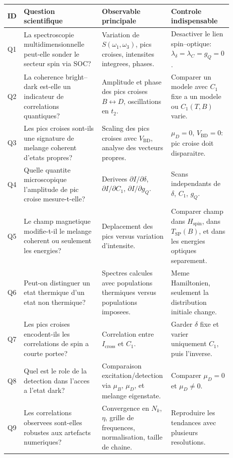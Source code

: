 \documentclass[11pt]{article}
\begin{document}
\begin{longtable}{>{\centering\arraybackslash}p{0.07\linewidth} p{0.34\linewidth} p{0.27\linewidth} p{0.22\linewidth}}
\toprule
ID & Question scientifique & Observable principale & Controle indispensable \\
\midrule
\endhead
Q1 & La spectroscopie multidimensionnelle peut-elle sonder le secteur spin via SOC? & Variation de \(S(\omega_1,\omega_3)\), pics croises, intensites integrees, phases. & Desactiver le lien spin--optique: \(\lambda_\delta=\lambda_C=g_Q=0\). \\
Q2 & La coherence bright--dark est-elle un indicateur de correlations quantiques? & Amplitude et phase des pics croises \(B\leftrightarrow D\), oscillations en \(t_2\). & Comparer un modele avec \(C_1\) fixe a un modele ou \(C_1(T,B)\) varie. \\
Q3 & Les pics croises sont-ils une signature de melange coherent d'etats propres? & Scaling des pics croises avec \(V_{\mathrm{BD}}\), analyse des vecteurs propres. & \(\mu_D=0\), \(V_{\mathrm{BD}}=0\): pic croise doit disparaitre. \\
Q4 & Quelle quantite microscopique l'amplitude de pic croise mesure-t-elle? & Derivees \(\partial I/\partial \delta\), \(\partial I/\partial C_1\), \(\partial I/\partial g_Q\). & Scans independants de \(\delta\), \(C_1\), \(g_Q\). \\
Q5 & Le champ magnetique modifie-t-il le melange coherent ou seulement les energies? & Deplacement des pics versus variation d'intensite. & Comparer champ dans \(H_{\mathrm{spin}}\), dans \(T_{\mathrm{SP}}(B)\), et dans les energies optiques separement. \\
Q6 & Peut-on distinguer un etat thermique d'un etat non thermique? & Spectres calcules avec populations thermiques versus populations imposees. & Meme Hamiltonien, seulement la distribution initiale change. \\
Q7 & Les pics croises encodent-ils les correlations de spin a courte portee? & Correlation entre \(I_{\mathrm{cross}}\) et \(C_1\). & Garder \(\delta\) fixe et varier uniquement \(C_1\), puis l'inverse. \\
Q8 & Quel est le role de la detection dans l'acces a l'etat dark? & Comparaison excitation/detection via \(\mu_B\), \(\mu_D\), et melange eigenstate. & Comparer \(\mu_D=0\) et \(\mu_D\neq0\). \\
Q9 & Les correlations observees sont-elles robustes aux artefacts numeriques? & Convergence en \(N_k\), \(\eta\), grille de frequences, normalisation, taille de chaine. & Reproduire les tendances avec plusieurs resolutions. \\
\bottomrule
\end{longtable}
\end{document}
